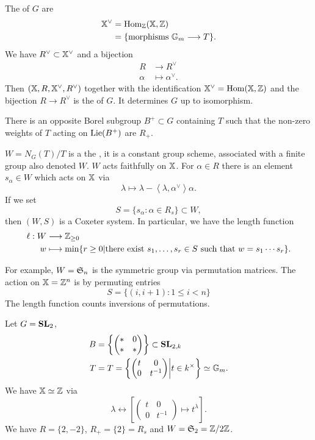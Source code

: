 The  of $G$ are
\begin{align*}
	\XX^{\vee} &= \Hom_\Z(\XX,\Z) \\
		   &= \{\text{morphisms }\Gm\to T\} .
\end{align*}
We have  $R^{\vee}\subset \XX^{\vee}$ and a bijection
\begin{align*}
	R &\longrightarrow R^{\vee} \\
	\alpha &\longmapsto \alpha ^{\vee}.
\end{align*}
Then $(\XX,R,\XX^{\vee},R^{\vee})$ together with the identification $\XX^{\vee}=\Hom(\XX,\Z)$ and the bijection $R\to R^{\vee}$ is the  of $G$. It determines $G$ up to isomorphism.

There is an opposite Borel subgroup $B^{+}\subset G$ containing $T$ such that the non-zero weights of $T$ acting on $\Lie(B^{+})$ are $R_+$.

$W=N_G(T) / T$ is a the , it is a constant group scheme, associated with a finite group also denoted $W$. $W$ acts faithfully on $\XX$. For $\alpha\in R$ there is an element $s_\alpha\in W$ which acts on $\XX$ via
\[
\lambda \mapsto \lambda - \left<\lambda,\alpha ^{\vee} \right>\alpha.
\] 
If we set
\[
S = \{s_\alpha : \alpha\in R_s\} \subset W,
\] 
then $(W,S)$ is a Coxeter system. In particular, we have the length function
\begin{align*}
	\ell: W &\longrightarrow \Z_{\ge 0} \\
	w &\longmapsto \min \{r\ge 0 | \text{there exist }s_1,\dots,s_r\in S\text{ such that }w=s_1\cdots s_r\} .	
\end{align*}
\begin{example}
	For example, $W=\S_n$ is the symmetric group via permutation matrices. The action on $\XX=\Z^{n}$ is by permuting entries
	\[
		S = \{(i,i+1):1\le i<n\}
	\] 
	The length function counts inversions of permutations.
\end{example}
\begin{example}
	Let $G=\SL_2$,
	\begin{align*}
		B &= \left\{ \begin{pmatrix} * & 0 \\ * & * \end{pmatrix}  \right\} \subset \SL_{2,k} \\
		T &= T = \left\{ \begin{pmatrix} t & 0 \\ 0 & t^{-1} \end{pmatrix} \middle| t\in k^{\times } \right\} \isoto \Gm.
	\end{align*}
	We have $\XX\isoto \Z$ via
	\[
		\lambda \leftrightarrow \left[ \begin{pmatrix} t & 0 \\ 0 & t^{-1} \end{pmatrix} \mapsto t ^{\lambda} \right] .
	\] 
	We have $R=\{2,-2\} $, $R_+=\{2\} =R_s$ and $W=\S_2=\Z /2\Z$.
\end{example}

